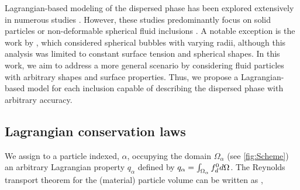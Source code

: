 Lagrangian-based modeling of the dispersed phase has been explored extensively in numerous studies \citep{buyevich1979flow, lhuillier1992volume, simonin1996, zhang1994averaged, zhang1994ensemble, zhang1997momentum, jackson1997locally, zaepffel2011modelisation}. However, these studies predominantly focus on solid particles \citep{buyevich1979flow, lhuillier1992volume, simonin1996, zhang1994averaged, jackson1997locally} or non-deformable spherical fluid inclusions \citep{zhang1994ensemble, zaepffel2011modelisation}. A notable exception is the work by \citep{zhang1994ensemble}, which considered spherical bubbles with varying radii, although this analysis was limited to constant surface tension and spherical shapes. In this work, we aim to address a more general scenario by considering fluid particles with arbitrary shapes and surface properties. Thus, we propose a Lagrangian-based model for each inclusion capable of describing the dispersed phase with arbitrary accuracy. %

 

\subsection{Lagrangian conservation laws}



We assign to a particle indexed, $\alpha$, occupying the domain $\Omega_\alpha$ (see \ref{fig:Scheme}) an arbitrary Lagrangian property $q_\alpha$ defined by $q_\alpha  = \int_{\Omega_\alpha}  f_d^0 d\Omega$. The Reynolds transport theorem for the (material) particle volume can be written as \citep{leal2007},

